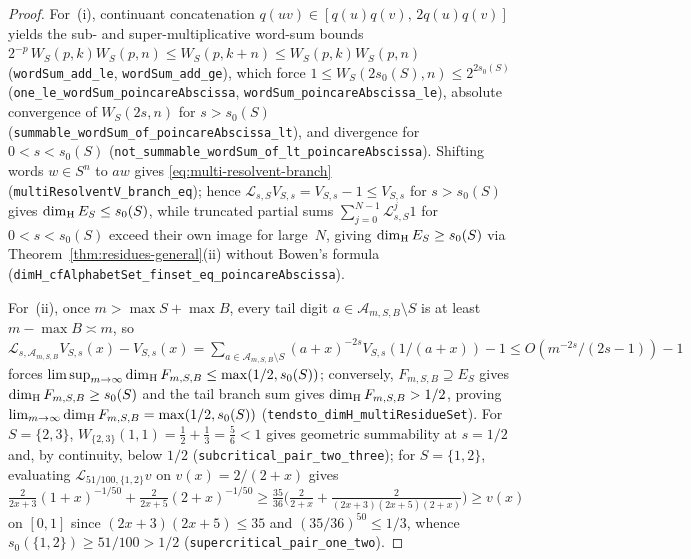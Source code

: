 \begin{proof}
For~(i), continuant concatenation $q(uv)\in[q(u)q(v),\,2q(u)q(v)]$ yields
the sub- and super-multiplicative word-sum bounds
$2^{-p}\,W_S(p,k)W_S(p,n)\le W_S(p,k+n)\le W_S(p,k)W_S(p,n)$
(\texttt{wordSum\_\allowbreak add\_\allowbreak le},
\texttt{wordSum\_\allowbreak add\_\allowbreak ge}), which force
$1\le W_S(2s_0(S),n)\le 2^{2s_0(S)}$ (\texttt{one\_\allowbreak le\_\allowbreak wordSum\_\allowbreak poincareAbscissa},
\texttt{wordSum\_\allowbreak poincareAbscissa\_\allowbreak le}), absolute
convergence of $W_S(2s,n)$ for $s>s_0(S)$
(\texttt{summable\_\allowbreak wordSum\_\allowbreak of\_\allowbreak poincareAbscissa\_\allowbreak lt}),
and divergence for $0<s<s_0(S)$
(\texttt{not\_\allowbreak summable\_\allowbreak wordSum\_\allowbreak of\_\allowbreak lt\_\allowbreak poincareAbscissa}).
Shifting words $w\in S^n$ to $aw$ gives \eqref{eq:multi-resolvent-branch}
(\texttt{multiResolventV\_\allowbreak branch\_\allowbreak eq}); hence
$\mathcal L_{s,S}V_{S,s}=V_{S,s}-1\le V_{S,s}$ for $s>s_0(S)$ gives
$\dim_{\mathrm{H}} E_S\le s_0(S)$, while truncated partial sums
$\sum_{j=0}^{N-1}\mathcal L_{s,S}^j 1$ for $0<s<s_0(S)$ exceed their own image
for large~$N$, giving $\dim_{\mathrm{H}} E_S\ge s_0(S)$ via
Theorem~\ref{thm:residues-general}(ii) without Bowen's formula
(\texttt{dimH\_\allowbreak cfAlphabetSet\_\allowbreak finset\_\allowbreak eq\_\allowbreak poincareAbscissa}).

For~(ii), once $m>\max S+\max B$, every tail digit
$a\in\mathcal A_{m,S,B}\setminus S$ is at least $m-\max B\asymp m$, so
$\mathcal L_{s,\mathcal A_{m,S,B}}V_{S,s}(x)-V_{S,s}(x)
=\sum_{a\in\mathcal A_{m,S,B}\setminus S}(a+x)^{-2s}V_{S,s}(1/(a+x))-1
\le O(m^{-2s}/(2s-1))-1$ forces $\limsup_{m\to\infty}\dim_{\mathrm{H}} F_{m,S,B}\le \max(1/2,s_0(S))$;
conversely, $F_{m,S,B}\supseteq E_S$ gives $\dim_{\mathrm{H}} F_{m,S,B}\ge s_0(S)$ and the
tail branch sum gives $\dim_{\mathrm{H}} F_{m,S,B}>1/2$, proving
$\lim_{m\to\infty}\dim_{\mathrm{H}} F_{m,S,B}=\max(1/2,s_0(S))$
(\texttt{tendsto\_\allowbreak dimH\_\allowbreak multiResidueSet}).
For $S=\{2,3\}$, $W_{\{2,3\}}(1,1)=\frac12+\frac13=\frac56<1$ gives geometric
summability at $s=1/2$ and, by continuity, below $1/2$
(\texttt{subcritical\_\allowbreak pair\_\allowbreak two\_\allowbreak three}); for $S=\{1,2\}$, evaluating
$\mathcal L_{51/100,\{1,2\}}v$ on $v(x)=2/(2+x)$ gives
$\frac{2}{2x+3}(1+x)^{-1/50}+\frac{2}{2x+5}(2+x)^{-1/50}\ge\frac{35}{36}\bigl(\frac{2}{2+x}+\frac{2}{(2x+3)(2x+5)(2+x)}\bigr)\ge v(x)$
on $[0,1]$ since $(2x+3)(2x+5)\le35$ and $(35/36)^{50}\le1/3$, whence
$s_0(\{1,2\})\ge 51/100>1/2$
(\texttt{supercritical\_\allowbreak pair\_\allowbreak one\_\allowbreak two}).


\end{proof}
